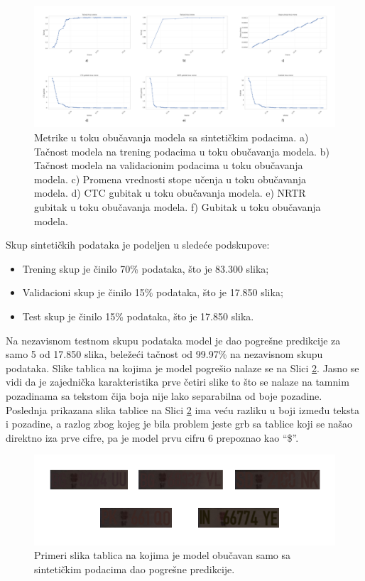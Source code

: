 \documentclass[a4paper,12pt]{article}
\begin{document}
	\begin{figure}[H]
		\centering
		\includegraphics[width=\textwidth]{assets/synthetic-data-metrics.png}
		\caption{Metrike u toku obučavanja modela sa sintetičkim podacima. a) Tačnost modela na trening podacima u toku obučavanja modela. b) Tačnost modela na validacionim podacima u toku obučavanja modela. c) Promena vrednosti stope učenja u toku obučavanja modela. d) CTC gubitak u toku obučavanja modela. e) NRTR gubitak u toku obučavanja modela. f) Gubitak u toku obučavanja modela.}
		\label{fig:synthetic-data-metrics}
	\end{figure}
	
	Skup sintetičkih podataka je podeljen u sledeće podskupove:
	\begin{itemize}
		\item Trening skup je činilo 70\% podataka, što je 83.300 slika;
		\item Validacioni skup je činilo 15\% podataka, što je 17.850 slika;
		\item Test skup je činilo 15\% podataka, što je 17.850 slika.
	\end{itemize}
	
	Na nezavisnom testnom skupu podataka model je dao pogrešne predikcije za samo 5 od 17.850 slika, beležeći tačnost od 99.97\% na nezavisnom skupu podataka. Slike tablica na kojima je model pogrešio nalaze se na Slici \ref{fig:bad-predictions-synthetic-data-model}. Jasno se vidi da je zajednička karakteristika prve četiri slike to što se nalaze na tamnim pozadinama sa tekstom čija boja nije lako separabilna od boje pozadine. Poslednja prikazana slika tablice na Slici \ref{fig:bad-predictions-synthetic-data-model} ima veću razliku u boji između teksta i pozadine, a razlog zbog kojeg je bila problem jeste grb sa tablice koji se našao direktno iza prve cifre, pa je model prvu cifru 6 prepoznao kao \enquote{\$}.
	
	\begin{figure}[H]
		\centering
		\includegraphics[width=\textwidth]{assets/bad-predictions-synthetic-data-model.png}
		\caption{Primeri slika tablica na kojima je model obučavan samo sa sintetičkim podacima dao pogrešne predikcije.}
		\label{fig:bad-predictions-synthetic-data-model}
	\end{figure}
	
\end{document}
